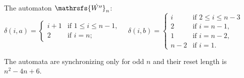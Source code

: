 \documentclass[runningheads,a4paper]{llncs}
\newcommand{\<}{\langle}
\renewcommand{\>}{\rangle}
\begin{document}
The automaton $\mathrsfs{\dot{W''}}_n$:\\
$\delta(i,a)=\begin{cases}
i+1 &\text{if } 1 \le i \le n-1,\\
2 &\text{if } i=n;
\end{cases}\quad
\delta(i,b)=\begin{cases}
i &\text{if } 2 \le i \le n-3\\
2 &\text{if } i=n-1,\\
1 &\text{if } i=n-2,\\
n-2 &\text{if } i=1.
\end{cases}$

The automata are synchronizing only for odd $n$ and their reset length is $n^2-4n+6$.


\end{document}
